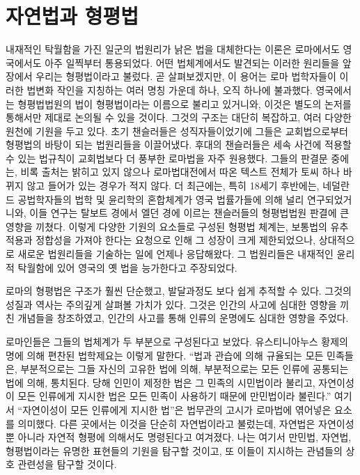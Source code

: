 \chapter{자연법과 형평법}

내재적인 탁월함을 가진
일군의 법원리가
낡은 법을 대체한다는 이론은
로마에서도 영국에서도 아주 일찍부터 통용되었다.
어떤 법체계에서도 발견되는
이러한 원리들을 앞 장에서 우리는 형평법이라고 불렀다.
곧 살펴보겠지만, 이 용어는
로마 법학자들이 이러한 법변화 작인을 지칭하는
여러 명칭 가운데 하나, 오직 하나에 불과했다.
영국에서는 형평법법원의 법이
형평법이라는 이름으로 불리고 있거니와,
이것은 별도의 논저를 통해서만 제대로 논의될 수 있을 것이다.
그것의 구조는 대단히 복잡하고, 여러 다양한 원천에 기원을 두고 있다.
초기 챈슬러들은 성직자들이었기에 그들은 교회법으로부터
형평법의 바탕이 되는 법원리들을 이끌어냈다.
후대의 챈슬러들은
세속 사건에 적용할 수 있는 법규칙이 교회법보다 더 풍부한 로마법을
자주 원용했다.
그들의 판결문 중에는, 비록 출처는 밝히고 있지 않으나
로마법대전에서 따온 텍스트 전체가 토씨 하나 바뀌지 않고
들어가 있는 경우가 적지 않다.
더 최근에는, 특히 18세기 후반에는,
네덜란드 공법학자들의 법학 및 윤리학의 혼합체계가 영국 법률가들에 의해
널리 연구되었거니와,
이들 연구는
탈보트 경에서 엘던 경에 이르는
챈슬러들의 형평법법원 판결에 큰 영향을 끼쳤다.
이렇게 다양한 기원의 요소들로 구성된 형평법 체계는,
보통법의 유추적용과 정합성을 가져야 한다는 요청으로 인해
그 성장이 크게 제한되었으나,
상대적으로 새로운 법원리들을 기술하는 일에 언제나 응답해왔다.
그 법원리들은 내재적인 윤리적 탁월함에 있어 영국의 옛 법을 능가한다고
주장되었다.

로마의 형평법은 구조가 훨씬 단순했고, 발달과정도 보다 쉽게 추적할 수 있다.
그것의 성질과 역사는 주의깊게 살펴볼 가치가 있다.
그것은 인간의 사고에 심대한 영향을 끼친 개념들을 창조하였고,
인간의 사고를 통해 인류의 운명에도 심대한 영향을 주었다.

로마인들은 그들의 법체계가 두 부분으로 구성된다고 보았다.
유스티니아누스 황제의 명에 의해 편찬된 법학제요는 이렇게 말한다.
``법과 관습에 의해 규율되는 모든 민족들은, 부분적으로는 그들 자신의
고유한 법에 의해, 부분적으로는 모든 인류에 공통되는 법에 의해,
통치된다. 당해 인민이 제정한 법은 그 민족의 시민법이라
불리고, 자연이성이 모든 인류에게 지시한 법은
모든 민족이 사용하기 때문에
만민법이라 불린다.''
여기서 ``자연이성이 모든 인류에게 지시한 법''은 법무관의 고시가
로마법에 엮어넣은 요소를 의미했다.
다른 곳에서는 이것을 단순히 자연법이라고 불렀는데,
자연법은 자연이성뿐 아니라 자연적 형평에 의해서도
명령된다고 여겨졌다.
나는 여기서 만민법, 자연법, 형평법이라는 유명한 표현들의 기원을 탐구할 것이고,
또 이들이 지시하는 관념들의 상호 관련성을 탐구할 것이다.

